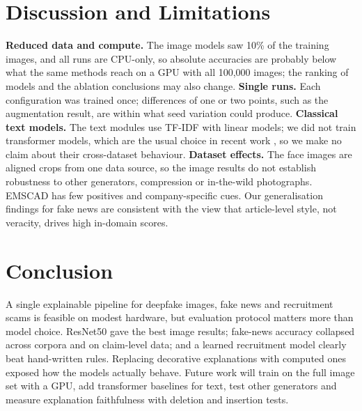 \documentclass[runningheads]{llncs}
\begin{document}
\section{Discussion and Limitations}
\textbf{Reduced data and compute.} The image models saw 10\% of the training images, and all runs are CPU-only, so absolute accuracies are probably below what the same methods reach on a GPU with all 100,000 images; the ranking of models and the ablation conclusions may also change. \textbf{Single runs.} Each configuration was trained once; differences of one or two points, such as the augmentation result, are within what seed variation could produce. \textbf{Classical text models.} The text modules use TF-IDF with linear models; we did not train transformer models, which are the usual choice in recent work \cite{r27,r38}, so we make no claim about their cross-dataset behaviour. \textbf{Dataset effects.} The face images are aligned crops from one data source, so the image results do not establish robustness to other generators, compression or in-the-wild photographs. EMSCAD has few positives and company-specific cues. Our generalisation findings for fake news are consistent with the view that article-level style, not veracity, drives high in-domain scores.

\section{Conclusion}
A single explainable pipeline for deepfake images, fake news and recruitment scams is feasible on modest hardware, but evaluation protocol matters more than model choice. ResNet50 gave the best image results; fake-news accuracy collapsed across corpora and on claim-level data; and a learned recruitment model clearly beat hand-written rules. Replacing decorative explanations with computed ones exposed how the models actually behave. Future work will train on the full image set with a GPU, add transformer baselines for text, test other generators and measure explanation faithfulness with deletion and insertion tests.
\end{document}
